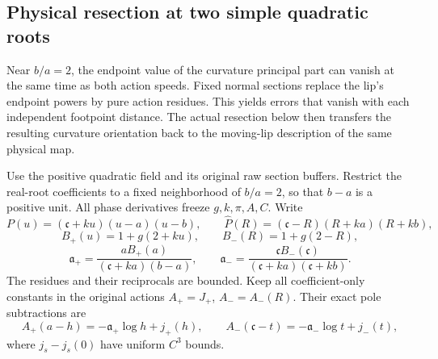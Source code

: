 \subsection{Physical resection at two simple quadratic roots}

Near \(b/a=2\), the endpoint value of the curvature principal part
can vanish at the same time as both action speeds. Fixed normal sections
replace the lip's endpoint powers by pure action residues. This yields
errors that vanish with each independent footpoint distance. The actual
resection below then transfers the resulting curvature orientation back
to the moving-lip description of the same physical map.

\begin{lemma}
\label{deg:lem-joint-root-physical-resection}
Use the positive quadratic field and its original raw section buffers.
Restrict the real-root coefficients to a fixed neighborhood of
\(b/a=2\), so that \(b-a\) is a positive unit. All phase derivatives
freeze \(g,k,\pi,A,C\). Write
\[
 P(u)=(\mathfrak c+ku)(u-a)(u-b),\qquad
 \widehat P(R)=(\mathfrak c-R)(R+ka)(R+kb),
\]
\[
 B_+(u)=1+g(2+ku),\qquad B_-(R)=1+g(2-R),
\]
\[
 \mathfrak a_+=\frac{aB_+(a)}{(\mathfrak c+ka)(b-a)},\qquad
 \mathfrak a_-=
 \frac{\mathfrak cB_-(\mathfrak c)}
      {(\mathfrak c+ka)(\mathfrak c+kb)}.
\]
The residues and their reciprocals are bounded. Keep all
coefficient-only constants in the original actions
\(A_+=J_+\), \(A_-=A_-(R)\). Their exact pole subtractions are
\[
 A_+(a-h)=-\mathfrak a_+\log h+j_+(h),\qquad
 A_-(\mathfrak c-t)=-\mathfrak a_-\log t+j_-(t),
\]
where \(j_s-j_s(0)\) have uniform \(C^3\) bounds.


\end{lemma}
